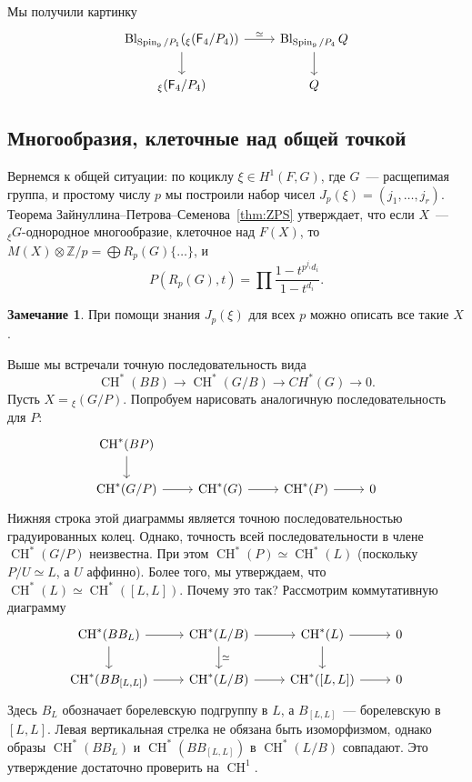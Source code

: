 \documentclass[a4paper]{article}
\DeclareMathOperator{\Spin}{Spin}
\DeclareMathOperator{\CH}{CH}
\DeclareMathOperator{\Bl}{Bl}
\newcommand{\isom}{\simeq}
\theoremstyle{definition}
\newtheorem{remark}[theorem]{Замечание}
\begin{document}
Мы получили картинку
\[
\begin{tikzcd}
\Bl_{\Spin_9/P_1}({}_{\xi}(\mathsf{F}_4/P_4)) \arrow{r}{\isom}\arrow{d}
& \Bl_{\Spin_9/P_4}Q\arrow{d} \\
{}_{\xi}(\mathsf{F}_4/P_4) & Q
\end{tikzcd}
\]


\subsection{Многообразия, клеточные над общей точкой}

Вернемся к общей ситуации: по коциклу $\xi\in H^1(F,G)$, где
$G$~--- расщепимая группа, и простому числу $p$ мы построили
набор чисел $J_p(\xi) = (j_1,\dots,j_r)$.
Теорема Зайнуллина--Петрова--Семенова~\ref{thm:ZPS} утверждает,
что если $X$~--- ${}_{\xi}G$-однородное многообразие, клеточное
над $F(X)$, то $M(X)\otimes\mathbb{Z}/p = \bigoplus R_p(G)\{\dots\}$,
и
\[
P(R_p(G),t) = \prod\frac{1-t^{p^{j_i}d_i}}{1-t^{d_i}}.
\]
\begin{remark}
При помощи знания $J_p(\xi)$ для всех $p$ можно описать все такие $X$.
\end{remark}
Выше мы встречали точную последовательность вида
\[
\CH^*(BB) \to \CH^*(G/B) \to CH^*(G) \to 0.
\]
Пусть $X = {}_{\xi}(G/P)$.
Попробуем нарисовать аналогичную последовательность для $P$:
\[
\begin{tikzcd}
\CH^*(BP) \arrow{d} \\
\CH^*(G/P) \arrow{r} & \CH^*(G)\arrow{r} & \CH^*(P)\arrow{r} & 0
\end{tikzcd}
\]
Нижняя строка этой диаграммы является точною последовательностью
градуированных колец.
Однако, точность всей последовательности в члене $\CH^*(G/P)$
неизвестна.
При этом $\CH^*(P) \isom \CH^*(L)$ (поскольку $P/U\isom L$,
а $U$ аффинно).
Более того, мы утверждаем, что $\CH^*(L) \isom \CH^*([L,L])$.
Почему это так?
Рассмотрим коммутативную диаграмму
\[
\begin{tikzcd}
\CH^*(BB_L) \arrow{r}\arrow{d}
& \CH^*(L/B) \arrow{r}\arrow{d}{\isom}
& \CH^*(L) \arrow{d}\arrow{r}
& 0 \\
\CH^*(BB_{[L,L]}) \arrow{r}
& \CH^*(L/B) \arrow{r}
& \CH^*([L,L]) \arrow{r}
& 0
\end{tikzcd}
\]
Здесь $B_L$ обозначает борелевскую подгруппу в $L$, а
$B_{[L,L]}$~--- борелевскую в $[L,L]$.
Левая вертикальная стрелка не обязана быть изоморфизмом,
однако образы $\CH^*(BB_L)$ и $\CH^*(BB_{[L,L]})$ в
$\CH^*(L/B)$ совпадают.
Это утверждение достаточно проверить на $\CH^1$.
\end{document}
